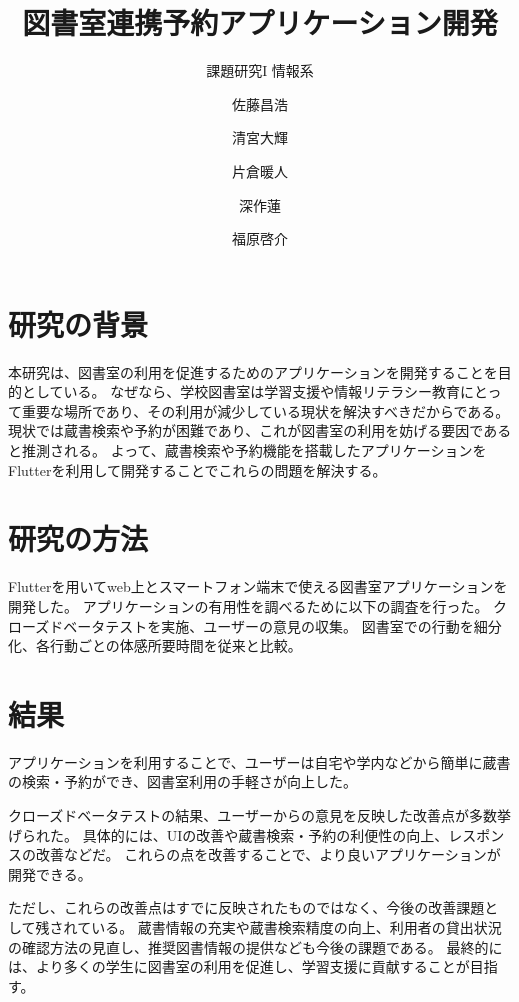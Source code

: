 \documentclass[twocolumn]{bxjsarticle}
\begin{document}
\title{図書室連携予約アプリケーション開発}
\author{課題研究I 情報系\and 佐藤昌浩 \and 清宮大輝 \and 片倉暖人 \and 深作蓮 \and 福原啓介}
\date{\vspace{-10mm}}


\section{研究の背景}
本研究は、図書室の利用を促進するためのアプリケーションを開発することを目的としている。
なぜなら、学校図書室は学習支援や情報リテラシー教育にとって重要な場所であり、その利用が減少している現状を解決すべきだからである。
現状では蔵書検索や予約が困難であり、これが図書室の利用を妨げる要因であると推測される。
よって、蔵書検索や予約機能を搭載したアプリケーションをFlutterを利用して開発することでこれらの問題を解決する。
\section{研究の方法}
Flutterを用いてweb上とスマートフォン端末で使える図書室アプリケーションを開発した。
アプリケーションの有用性を調べるために以下の調査を行った。
クローズドベータテストを実施、ユーザーの意見の収集。
図書室での行動を細分化、各行動ごとの体感所要時間を従来と比較。
\section{結果}
アプリケーションを利用することで、ユーザーは自宅や学内などから簡単に蔵書の検索・予約ができ、図書室利用の手軽さが向上した。

クローズドベータテストの結果、ユーザーからの意見を反映した改善点が多数挙げられた。
具体的には、UIの改善や蔵書検索・予約の利便性の向上、レスポンスの改善などだ。
これらの点を改善することで、より良いアプリケーションが開発できる。

ただし、これらの改善点はすでに反映されたものではなく、今後の改善課題として残されている。
蔵書情報の充実や蔵書検索精度の向上、利用者の貸出状況の確認方法の見直し、推奨図書情報の提供なども今後の課題である。
最終的には、より多くの学生に図書室の利用を促進し、学習支援に貢献することが目指す。
\newpage
\end{document}
